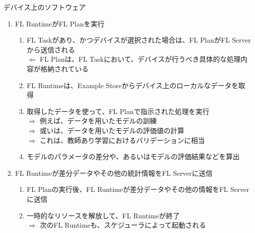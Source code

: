 \documentclass[dvipdfmx,notheorems,t]{beamer}
\begin{document}
\begin{frame}{デバイス上のソフトウェア}
\begin{enumerate}
	\item FL RuntimeがFL Planを実行
	\begin{enumerate}
		\item FL Taskがあり、かつデバイスが選択された場合は、FL PlanがFL Serverから送信される \\
		$\Leftarrow$ FL Planは、FL Taskにおいて、デバイスが行うべき具体的な処理内容が格納されている
		\newline
		\item FL Runtimeは、Example Storeからデバイス上のローカルなデータを取得
		\newline
		\item 取得したデータを使って、FL Planで指示された処理を実行 \\
		$\Rightarrow$ 例えば、データを用いたモデルの訓練 \\
		$\Rightarrow$ 或いは、データを用いたモデルの評価値の計算 \\
		$\Rightarrow$ これは、教師あり学習におけるバリデーションに相当
		\newline
		\item モデルのパラメータの差分や、あるいはモデルの評価結果などを算出
	\end{enumerate}
	
	\framebreak
	
	\item FL Runtimeが差分データやその他の統計情報をFL Serverに送信
	\begin{enumerate}
		\item FL Planの実行後、FL Runtimeが差分データやその他の情報をFL Serverに送信
		\newline
		\item 一時的なリソースを解放して、FL Runtimeが終了 \\
		$\Rightarrow$ 次のFL Runtimeも、スケジューラによって起動される
	\end{enumerate}
\end{enumerate}

\end{frame}
\end{document}
